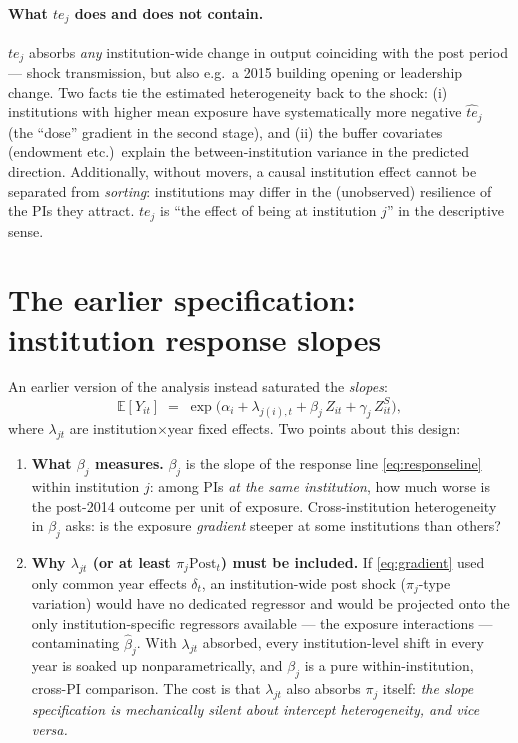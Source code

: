 \documentclass[11pt]{article}
\newcommand{\E}{\mathbb{E}}
\newcommand{\Post}{\mathrm{Post}}
\begin{document}
\paragraph{What $te_j$ does and does not contain.}
$te_j$ absorbs \emph{any} institution-wide change in output coinciding with
the post period --- shock transmission, but also e.g.\ a 2015 building
opening or leadership change. Two facts tie the estimated heterogeneity back
to the shock: (i) institutions with higher mean exposure have systematically
more negative $\hat{te}_j$ (the ``dose'' gradient in the second stage), and
(ii) the buffer covariates (endowment etc.)\ explain the between-institution
variance in the predicted direction. Additionally, without movers, a causal
institution effect cannot be separated from \emph{sorting}: institutions may
differ in the (unobserved) resilience of the PIs they attract. $te_j$ is
``the effect of being at institution $j$'' in the descriptive sense.

\section{The earlier specification: institution response slopes}
\label{sec:gradient}

An earlier version of the analysis instead saturated the \emph{slopes}:
\begin{equation}
\E[Y_{it}] \;=\; \exp\Big( \alpha_i + \lambda_{j(i),t}
+ \beta_j \, Z_{it} + \gamma_j \, Z^{S}_{it} \Big),
\label{eq:gradient}
\end{equation}
where $\lambda_{jt}$ are institution$\times$year fixed effects. Two points
about this design:

\begin{enumerate}
\item \textbf{What $\beta_j$ measures.} $\beta_j$ is the slope of the
response line \eqref{eq:responseline} within institution $j$: among PIs
\emph{at the same institution}, how much worse is the post-2014 outcome per
unit of exposure. Cross-institution heterogeneity in $\beta_j$ asks: is the
exposure \emph{gradient} steeper at some institutions than others?

\item \textbf{Why $\lambda_{jt}$ (or at least $\pi_j \Post_t$) must be
included.} If \eqref{eq:gradient} used only common year effects $\delta_t$,
an institution-wide post shock ($\pi_j$-type variation) would have no
dedicated regressor and would be projected onto the only institution-specific
regressors available --- the exposure interactions --- contaminating
$\hat\beta_j$. With $\lambda_{jt}$ absorbed, every institution-level shift in
every year is soaked up nonparametrically, and $\beta_j$ is a pure
within-institution, cross-PI comparison. The cost is that $\lambda_{jt}$
also absorbs $\pi_j$ itself: \emph{the slope specification is mechanically
silent about intercept heterogeneity, and vice versa.}
\end{enumerate}
\end{document}
